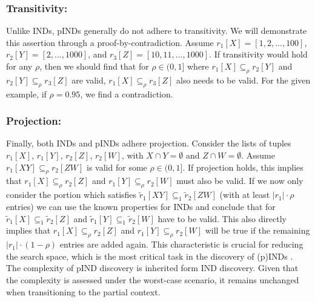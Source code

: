 \subsubsection{\textbf{Transitivity:}}
Unlike INDs, pINDs generally do not adhere to transitivity. We will demonstrate this assertion through a proof-by-contradiction. Assume $r_1[X] = [1, 2, ..., 100]$, $r_2[Y] = [2, ..., 1000]$, and $r_3[Z] = [10, 11, ..., 1000]$. If transitivity would hold for any $\rho$, then we should find that for $\rho \in (0, 1]$ where $r_1[X] \subseteq_\rho r_2[Y]$ and $ r_2[Y] \subseteq_\rho  r_3[Z]$ are valid, $ r_1[X] \subseteq_\rho  r_3[Z]$ also needs to be valid. For the given example, if $\rho = 0.95$, we find a contradiction.

\subsubsection{\textbf{Projection:}}
Finally, both INDs and pINDs adhere projection. Consider the lists of tuples $r_1[X]$, $r_1[Y]$, $r_2[Z]$, $r_2[W]$, with $X \cap Y = \emptyset$ and $Z \cap W = \emptyset$. Assume $r_1[XY] \subseteq_\rho r_2[ZW]$ is valid for some $\rho \in (0, 1]$. If projection holds, this implies that $r_1[X] \subseteq_\rho r_2[Z]$ and $r_1[Y] \subseteq_\rho r_2[W]$ must also be valid. If we now only consider the portion which satisfies $\tilde r_1[XY] \subseteq_1 \tilde r_2[ZW]$ (with at least $|r_1| \cdot \rho$ entries) we can use the known properties for INDs and conclude that for $\tilde r_1[X] \subseteq_1 \tilde r_2[Z]$ and $\tilde r_1[Y] \subseteq_1 \tilde r_2[W]$ have to be valid. This also directly implies that $r_1[X] \subseteq_\rho r_2[Z]$ and $r_1[Y] \subseteq_\rho r_2 [W]$ will be true if the remaining $|r_1| \cdot (1-\rho)$ entries are added again. This characteristic is crucial for reducing the search space, which is the most critical task in the discovery of (p)INDs \cite{liu2010discover}. \\

\noindent The complexity of pIND discovery is inherited form IND discovery. Given that the complexity is assessed under the worst-case scenario, it remains unchanged when transitioning to the partial context.

